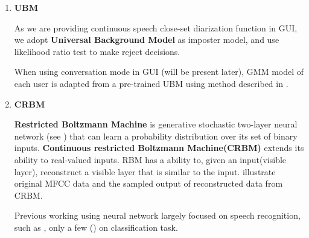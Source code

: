\begin{enumerate}
		\item \textbf{UBM}

			As we are providing continuous speech close-set diarization function in
			GUI, we adopt \textbf{Universal Background Model} as imposter model,
			and use likelihood ratio test to make reject
			decisions.\cite{reynolds2000speaker}

			When using conversation mode in GUI (will be present later),
			GMM model of each user is adapted from a pre-trained UBM
			using method described in \cite{reynolds2000speaker}.

		\item \textbf{CRBM}

          \textbf{Restricted Boltzmann Machine} is generative stochastic
		  two-layer neural network (see ) that can learn a probability distribution
			over its set of binary inputs\cite{rbm_wiki}.  \textbf{Continuous
			restricted Boltzmann Machine(CRBM)}\cite{chen2003continuous} extends
			its ability to real-valued inputs.  RBM has a ability to, given an
			input(visible layer), reconstruct a visible layer that is similar
			to the input.   illustrate original MFCC data and the
			sampled output of reconstructed data from CRBM.

			Previous working using neural network largely focused on speech
			recognition, such as \cite{deep} \cite{mohamed20111deep}, only a
			few (\cite{}) on classification task.


\end{enumerate}
